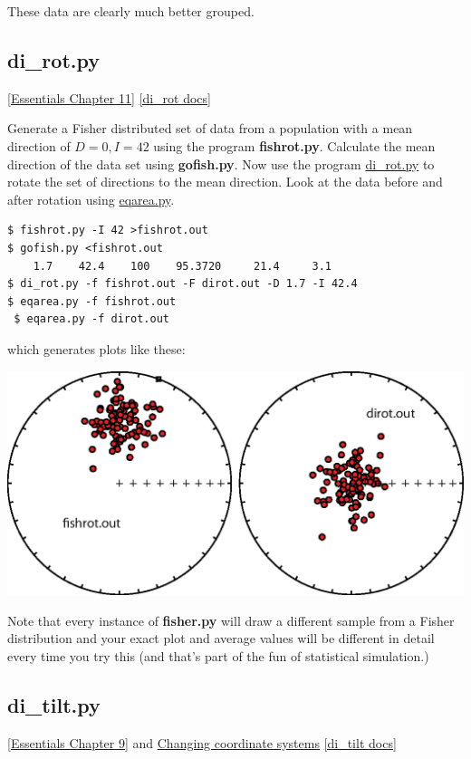 \documentclass[11pt]{book}
\begin{document}
{{  \noindent These data are clearly much better grouped.



\subsection{di\_rot.py}
\href{http://earthref.org/MAGIC/books/Tauxe/Essentials/WebBook3ch11.html#ch11}{[Essentials Chapter  11]}
\href{https://github.com/PmagPy/PmagPy/blob/master/programs/di_rot.py}{[di\_rot docs]}


Generate a Fisher distributed set of data from a population with a mean direction of $D=0, I=42$ using the program {\bf fishrot.py}.  Calculate the mean direction of the data set using {\bf gofish.py}.  Now use the program \href{#di_rot.py}{di\_rot.py} to rotate the set of directions to the mean direction.  Look at the data before and after rotation using \href{#eqarea.py}{eqarea.py}.

\begin{verbatim}
$ fishrot.py -I 42 >fishrot.out
$ gofish.py <fishrot.out
    1.7    42.4    100    95.3720     21.4     3.1
$ di_rot.py -f fishrot.out -F dirot.out -D 1.7 -I 42.4
$ eqarea.py -f fishrot.out
 $ eqarea.py -f dirot.out
\end{verbatim}

\noindent  which generates plots like these:

\includegraphics[width=15cm]{EPSfiles/dirot.eps}

Note that every instance of {\bf fisher.py} will draw a different sample from a Fisher distribution and your exact plot and average values will be different in detail every time you try this (and that's part of the fun of statistical simulation.)


\subsection{di\_tilt.py}
\href{http://earthref.org/MAGIC/books/Tauxe/Essentials/WebBook3ch9.html#ch9}{[Essentials Chapter 9]} and
\href{http://earthref.org/MAGIC/books/Tauxe/Essentials/WebBook3ap1.html#Changing_coordinate_systems}{Changing coordinate systems}
\href{https://github.com/PmagPy/PmagPy/blob/master/programs/di_tilt.py}{[di\_tilt docs]}


}}
\end{document}
